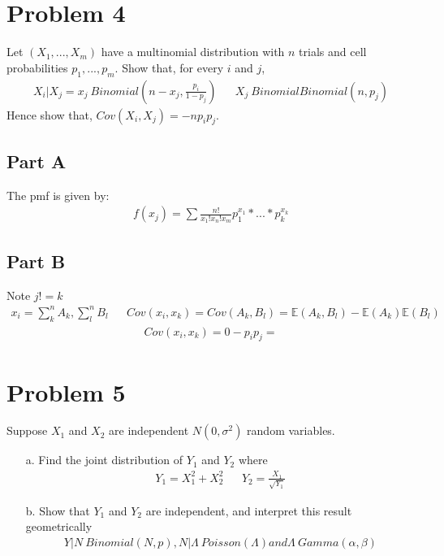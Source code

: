 \documentclass{article}
\begin{document}
\pagebreak

\section*{Problem 4}
Let $(X_1,...,X_m)$ have a multinomial distribution with $n$ trials and cell probabilities
$p_1,...,p_m$. Show that, for every $i$ and $j$,
\begin{align*}
X_i|X_j = x_j ~ Binomial(n-x_j, \frac{p_i}{1-p_j}) && X_j ~ Binomial Binomial(n,p_j)
\end{align*}
Hence show that, $Cov(X_i,X_j) = -n p_i p_j$.
\subsection*{Part A}
The pmf is given by:
\begin{align*}
f(x_j) = \sum \frac{n!}{x_1! x_n! x_m} p_1^{x_1}*...*p_k^{x_k}
\end{align*}


\subsection*{Part B}
Note $j!=k$
\begin{align*}
x_i = \sum_k^{n} A_k, \sum_l^{n} B_l && Cov(x_i, x_k) = Cov(A_k,B_l) = \mathbb{E}(A_k,B_l) - \mathbb{E}(A_k)\mathbb{E}(B_l)
\end{align*}
\begin{align*}
\boxed {Cov(x_i, x_k) = 0 - p_i p_j = }
\end{align*}


\pagebreak





\section*{Problem 5}
Suppose $X_1$ and $X_2$ are independent $N(0,\sigma^2)$ random variables.
\begin{enumerate}
\item[a.]
Find the joint distribution of $Y_1$ and $Y_2$ where
\begin{align*}
Y_1 = X_{1}^{2} + X_{2}^{2} && Y_2 = \frac{X_1}{\sqrt{Y_1}}
\end{align*}
\item[b.]
Show that $Y_1$ and $Y_2$ are independent, and interpret this result geometrically
\begin{align*}
Y|N ~ Binomial(N,p), N|\Lambda~Poisson(\Lambda) and \Lambda ~ Gamma(\alpha, \beta)
\end{align*}
\end{enumerate}
\end{document}
